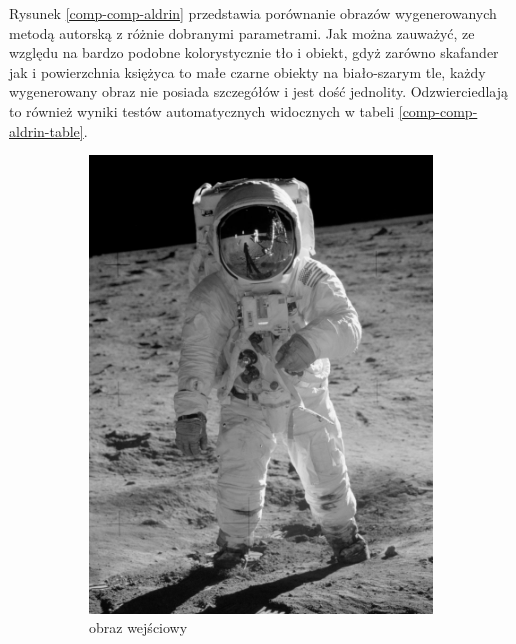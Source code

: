 \documentclass[a4paper, 12pt, polish, twoside]{extreport}
\begin{document}
	Rysunek \ref{comp-comp-aldrin} przedstawia porównanie obrazów wygenerowanych metodą autorską z różnie dobranymi parametrami. Jak można zauważyć, ze względu na bardzo podobne kolorystycznie tło i obiekt, gdyż zarówno skafander jak i powierzchnia księżyca to małe czarne obiekty na biało-szarym tle, każdy wygenerowany obraz nie posiada szczegółów i jest dość jednolity. Odzwierciedlają to również wyniki testów automatycznych widocznych w tabeli \ref{comp-comp-aldrin-table}.
	\begin{figure}[H] 
    \centering
    \begin{subfigure}{0.24\textwidth}
        \centering
        \includegraphics[width = \textwidth]{img/6-comp/aldrin_original_c10_inv0.png}
        \caption{obraz wejściowy}
        \label{comp-comp-aldrin-a}
    \end{subfigure}
    \begin{subfigure}{0.24\textwidth}
        \centering

\end{subfigure}
\end{figure}
\end{document}
